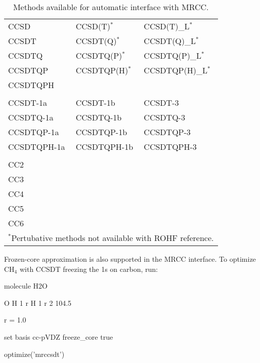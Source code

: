 \begin{table}
\caption{Methods available for automatic interface with MRCC.} 
\label{tab:mrccauto}
\begin{center}
\small
\begin{tabular}{lll} \hline\hline
CCSD        & CCSD(T)$^*$      & CCSD(T)\_L$^*$    \\
CCSDT       & CCSDT(Q)$^*$     & CCSDT(Q)\_L$^*$   \\
CCSDTQ      & CCSDTQ(P)$^*$    & CCSDTQ(P)\_L$^*$  \\
CCSDTQP     & CCSDTQP(H)$^*$   & CCSDTQP(H)\_L$^*$ \\
CCSDTQPH    &                  &                   \\
            &                  &                   \\
CCSDT-1a    & CCSDT-1b         & CCSDT-3           \\
CCSDTQ-1a   & CCSDTQ-1b        & CCSDTQ-3          \\
CCSDTQP-1a  & CCSDTQP-1b       & CCSDTQP-3         \\
CCSDTQPH-1a & CCSDTQPH-1b      & CCSDTQPH-3        \\
            &                  &                   \\
CC2         &                  &                   \\
CC3         &                  &                   \\
CC4         &                  &                   \\
CC5         &                  &                   \\
CC6         &                  &                   \\
\hline\hline
\multicolumn{3}{l}{
\footnotesize{$^*$Pertubative methods not available with ROHF reference.}
}
\end{tabular}
\end{center}
\end{table}

Frozen-core approximation is also supported in the MRCC interface. To optimize CH$_4$ with CCSDT freezing the 1s on carbon, run:

\begin{Snippet}
molecule H2O {
    O
    H 1 r
    H 1 r 2 104.5

    r = 1.0
}

set {
    basis cc-pVDZ
    freeze_core true
}

optimize('mrccsdt')
\end{Snippet}
